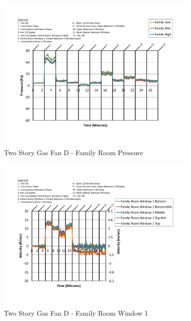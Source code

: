 \documentclass{article}
\begin{document}
\begin{appendices}
	\begin{figure}[H]
		\centering
		\includegraphics[height=3.05in,trim=0.67in 1.1in 0.67in 0.8in,clip=true]{0_Images/Results_Charts/ColdFlow/Two_Story/Gas/D/Family_Room_Pressure.pdf}
		\caption{Two Story Gas Fan D - Family Room Pressure}
	\end{figure}
 

	\begin{figure}[H]
		\centering
		\includegraphics[height=3.05in,trim=0.67in 1.1in 0.67in 0.8in,clip=true]{0_Images/Results_Charts/ColdFlow/Two_Story/Gas/D/Family_Room_Window_1.pdf}
		\caption{Two Story Gas Fan D - Family Room Window 1}
	\end{figure}
 
	\clearpage


\end{appendices}
\end{document}
